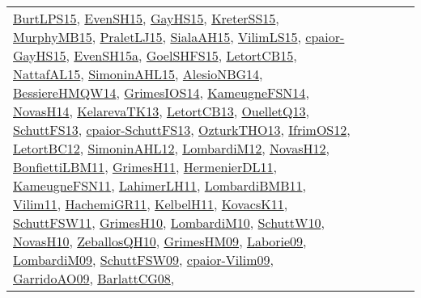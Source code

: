 {\begin{longtable}{llp{6cm}p{6cm}p{6cm}}
\href{papers/BurtLPS15.pdf}{BurtLPS15}\cite{BurtLPS15}, \href{papers/EvenSH15.pdf}{EvenSH15}\cite{EvenSH15}, \href{papers/GayHS15.pdf}{GayHS15}\cite{GayHS15}, \href{papers/KreterSS15.pdf}{KreterSS15}\cite{KreterSS15}, \href{papers/MurphyMB15.pdf}{MurphyMB15}\cite{MurphyMB15}, \href{papers/PraletLJ15.pdf}{PraletLJ15}\cite{PraletLJ15}, \href{papers/SialaAH15.pdf}{SialaAH15}\cite{SialaAH15}, \href{papers/VilimLS15.pdf}{VilimLS15}\cite{VilimLS15}, \href{papers/cpaior-GayHS15.pdf}{cpaior-GayHS15}\cite{cpaior-GayHS15}, \href{articles/EvenSH15a.pdf}{EvenSH15a}\cite{EvenSH15a}, \href{articles/GoelSHFS15.pdf}{GoelSHFS15}\cite{GoelSHFS15}, \href{articles/LetortCB15.pdf}{LetortCB15}\cite{LetortCB15}, \href{articles/NattafAL15.pdf}{NattafAL15}\cite{NattafAL15}, \href{articles/SimoninAHL15.pdf}{SimoninAHL15}\cite{SimoninAHL15}, \href{papers/AlesioNBG14.pdf}{AlesioNBG14}\cite{AlesioNBG14}, \href{papers/BessiereHMQW14.pdf}{BessiereHMQW14}\cite{BessiereHMQW14}, \href{articles/GrimesIOS14.pdf}{GrimesIOS14}\cite{GrimesIOS14}, \href{articles/KameugneFSN14.pdf}{KameugneFSN14}\cite{KameugneFSN14}, \href{articles/NovasH14.pdf}{NovasH14}\cite{NovasH14}, \href{papers/KelarevaTK13.pdf}{KelarevaTK13}\cite{KelarevaTK13}, \href{papers/LetortCB13.pdf}{LetortCB13}\cite{LetortCB13}, \href{papers/OuelletQ13.pdf}{OuelletQ13}\cite{OuelletQ13}, \href{papers/SchuttFS13.pdf}{SchuttFS13}\cite{SchuttFS13}, \href{papers/cpaior-SchuttFS13.pdf}{cpaior-SchuttFS13}\cite{cpaior-SchuttFS13}, \href{articles/OzturkTHO13.pdf}{OzturkTHO13}\cite{OzturkTHO13}, \href{papers/IfrimOS12.pdf}{IfrimOS12}\cite{IfrimOS12}, \href{papers/LetortBC12.pdf}{LetortBC12}\cite{LetortBC12}, \href{papers/SimoninAHL12.pdf}{SimoninAHL12}\cite{SimoninAHL12}, \href{articles/LombardiM12.pdf}{LombardiM12}\cite{LombardiM12}, \href{articles/NovasH12.pdf}{NovasH12}\cite{NovasH12}, \href{papers/BonfiettiLBM11.pdf}{BonfiettiLBM11}\cite{BonfiettiLBM11}, \href{papers/GrimesH11.pdf}{GrimesH11}\cite{GrimesH11}, \href{papers/HermenierDL11.pdf}{HermenierDL11}\cite{HermenierDL11}, \href{papers/KameugneFSN11.pdf}{KameugneFSN11}\cite{KameugneFSN11}, \href{papers/LahimerLH11.pdf}{LahimerLH11}\cite{LahimerLH11}, \href{papers/LombardiBMB11.pdf}{LombardiBMB11}\cite{LombardiBMB11}, \href{papers/Vilim11.pdf}{Vilim11}\cite{Vilim11}, \href{articles/HachemiGR11.pdf}{HachemiGR11}\cite{HachemiGR11}, \href{articles/KelbelH11.pdf}{KelbelH11}\cite{KelbelH11}, \href{articles/KovacsK11.pdf}{KovacsK11}\cite{KovacsK11}, \href{articles/SchuttFSW11.pdf}{SchuttFSW11}\cite{SchuttFSW11}, \href{papers/GrimesH10.pdf}{GrimesH10}\cite{GrimesH10}, \href{papers/LombardiM10.pdf}{LombardiM10}\cite{LombardiM10}, \href{papers/SchuttW10.pdf}{SchuttW10}\cite{SchuttW10}, \href{articles/NovasH10.pdf}{NovasH10}\cite{NovasH10}, \href{articles/ZeballosQH10.pdf}{ZeballosQH10}\cite{ZeballosQH10}, \href{papers/GrimesHM09.pdf}{GrimesHM09}\cite{GrimesHM09}, \href{papers/Laborie09.pdf}{Laborie09}\cite{Laborie09}, \href{papers/LombardiM09.pdf}{LombardiM09}\cite{LombardiM09}, \href{papers/SchuttFSW09.pdf}{SchuttFSW09}\cite{SchuttFSW09}, \href{papers/cpaior-Vilim09.pdf}{cpaior-Vilim09}\cite{cpaior-Vilim09}, \href{articles/GarridoAO09.pdf}{GarridoAO09}\cite{GarridoAO09}, \href{papers/BarlattCG08.pdf}{BarlattCG08}\cite{BarlattCG08}, 
\end{longtable}}
